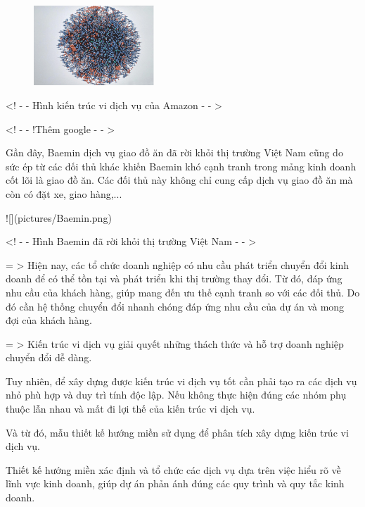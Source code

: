 \begin{figure}[h]

\centering

\includegraphics[height = 3cm]{pictures/KienTrucViDichVuAmazon.png}


\end{figure}

<! - - Hình kiến trúc vi dịch vụ của Amazon - - >

<! - - !Thêm google - - >

Gần đây, Baemin dịch vụ giao đồ ăn đã rời khỏi thị trường Việt Nam cũng do sức ép từ các đối thủ khác khiến Baemin khó cạnh tranh trong mảng kinh doanh cốt lõi là giao đồ ăn. Các đối thủ này không chỉ cung cấp dịch vụ giao đồ ăn mà còn có đặt xe, giao hàng,...

![](pictures/Baemin.png)

<! - - Hình Baemin đã rời khỏi thị trường Việt Nam - - >

= > Hiện nay, các tổ chức doanh nghiệp có nhu cầu phát triển chuyển đổi kinh doanh để có thể tồn tại và phát triển khi thị trường thay đổi. Từ đó, đáp ứng nhu cầu của khách hàng, giúp mang đến ưu thế cạnh tranh so với các đối thủ. Do đó cần hệ thống chuyển đổi nhanh chóng đáp ứng nhu cầu của dự án và mong đợi của khách hàng.

= > Kiến trúc vi dịch vụ giải quyết những thách thức và hỗ trợ doanh nghiệp chuyển đổi dễ dàng.

Tuy nhiên, để xây dựng được kiến trúc vi dịch vụ tốt cần phải tạo ra các dịch vụ nhỏ phù hợp và duy trì tính độc lập. Nếu không thực hiện đúng các nhóm phụ thuộc lẫn nhau và mất đi lợi thế của kiến trúc vi dịch vụ.

Và từ đó, mẫu thiết kế hướng miền sử dụng để phân tích xây dựng kiến trúc vi dịch vụ.

Thiết kế hướng miền xác định và tổ chức các dịch vụ dựa trên việc hiểu rõ về lĩnh vực kinh doanh, giúp dự án phản ánh đúng các quy trình và quy tắc kinh doanh.



